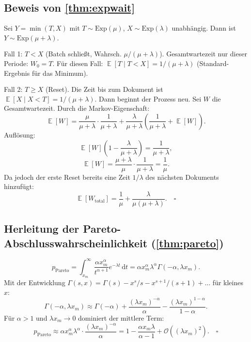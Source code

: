 ﻿\documentclass[12pt, a4paper]{article}
\DeclareMathOperator{\E}{\mathbb{E}}
\newcommand{\Exp}{\mathrm{Exp}}
\newcommand{\Pareto}{\mathrm{Pareto}}
\begin{document}
\subsection{Beweis von \cref{thm:expwait}}

Sei $Y = \min(T, X)$ mit $T \sim \Exp(\mu)$, $X \sim \Exp(\lambda)$ unabhängig.
Dann ist $Y \sim \Exp(\mu + \lambda)$.

Fall 1: $T < X$ (Batch schließt, Wahrsch. $\mu/(\mu+\lambda)$). Gesamtwartezeit
nur dieser Periode: $W_0 = T$. Für diesen Fall:
$\E[T \mid T < X] = 1/(\mu + \lambda)$ (Standard-Ergebnis für das Minimum).

Fall 2: $T \geq X$ (Reset). Die Zeit bis zum Dokument ist $\E[X \mid X < T]
= 1/(\mu+\lambda)$. Dann beginnt der Prozess neu. Sei $W$ die Gesamtwartezeit.
Durch die Markov-Eigenschaft:
\[
  \E[W] = \frac{\mu}{\mu+\lambda} \cdot \frac{1}{\mu+\lambda}
          + \frac{\lambda}{\mu+\lambda}\left(\frac{1}{\mu+\lambda} + \E[W]\right).
\]
Auflösung:
\[
  \E[W]\left(1 - \frac{\lambda}{\mu+\lambda}\right) =
  \frac{1}{\mu+\lambda},
\]
\[
  \E[W] = \frac{\mu+\lambda}{\mu} \cdot \frac{1}{\mu+\lambda} = \frac{1}{\mu}.
\]
Da jedoch der erste Reset bereits eine Zeit $1/\lambda$ des nächsten Dokuments
hinzufügt:
\[
  \E[W_{\mathrm{total}}] = \frac{1}{\mu} + \frac{\lambda}{\mu(\mu+\lambda)}. \quad \square
\]

\subsection{Herleitung der Pareto-Abschlusswahrscheinlichkeit (\cref{thm:pareto})}

\[
  p_{\Pareto} = \int_{x_m}^\infty \frac{\alpha x_m^\alpha}{t^{\alpha+1}}
  e^{-\lambda t}\,\mathrm{d}t
  = \alpha x_m^\alpha \lambda^\alpha \Gamma(-\alpha, \lambda x_m).
\]
Mit der Entwicklung $\Gamma(s, x) = \Gamma(s) - x^s/s - x^{s+1}/(s+1) + \ldots$
für kleines $x$:
\[
  \Gamma(-\alpha, \lambda x_m) \approx \Gamma(-\alpha) +
  \frac{(\lambda x_m)^{-\alpha}}{\alpha} - \frac{(\lambda x_m)^{1-\alpha}}{1-\alpha}.
\]
Für $\alpha > 1$ und $\lambda x_m \to 0$ dominiert der mittlere Term:
\[
  p_{\Pareto} \approx \alpha x_m^\alpha \lambda^\alpha \cdot
  \frac{(\lambda x_m)^{-\alpha}}{\alpha} = 1 - \frac{\alpha x_m \lambda}{\alpha-1}
  + \mathcal{O}((\lambda x_m)^2). \quad \square
\]
\end{document}
